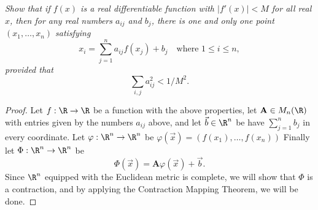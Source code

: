 \documentclass[12pt,letterpaper]{article}
\begin{document}
\begin{enumerate}
\textit{Show that if $f(x)$ is a real differentiable function with $|f'(x)|<M$ for all real $x$, then for any real numbers $a_{ij}$ and $b_{j}$, there is one and only one point $(x_1, \dots, x_n)$ satisfying
$$x_i=\sum_{j=1}^na_{ij}f(x_j)+b_j \quad \text{where } 1\leq i\leq n,$$
provided that 
$$\sum_{i,j}a_{ij}^2<1/M^2.$$}
\begin{proof}
Let $f:\R\to\R$ be a function with the above properties, let $\mathbf{A}\in M_n(\R)$ with entries given by the numbers $a_{ij}$ above, and let $\vec{b}\in\R^n$ be have $\sum_{j=1}^n b_j$ in every coordinate. Let $\varphi:\R^n\to\R^n$ be $\varphi(\vec{x})=(f(x_1), \dots, f(x_n))$ Finally let $\Phi:\R^n\to\R^n$ be
$$\Phi(\vec{x})=\mathbf{A}\varphi(\vec{x})+\vec{b}.$$
Since $\R^n$ equipped with the Euclidean metric is complete, we will show that $\Phi$ is a contraction, and by applying the Contraction Mapping Theorem, we will be done. 


\end{proof}
\end{enumerate}
\end{document}
